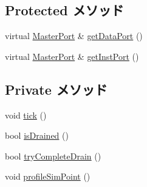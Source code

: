 \subsection*{Protected メソッド}
\begin{DoxyCompactItemize}
\item 
virtual \hyperlink{classMasterPort}{MasterPort} \& \hyperlink{classAtomicSimpleCPU_aeea6b55ae1c4be53c21dbee434b221d4}{getDataPort} ()
\item 
virtual \hyperlink{classMasterPort}{MasterPort} \& \hyperlink{classAtomicSimpleCPU_a40da530cb5dd380fd7fc0d786e94d5eb}{getInstPort} ()
\end{DoxyCompactItemize}
\subsection*{Private メソッド}
\begin{DoxyCompactItemize}
\item 
void \hyperlink{classAtomicSimpleCPU_a873dd91783f9efb4a590aded1f70d6b0}{tick} ()
\item 
bool \hyperlink{classAtomicSimpleCPU_ac166e5bc3ddf730beb1282cf821096ae}{isDrained} ()
\item 
bool \hyperlink{classAtomicSimpleCPU_abfea8f75a7a7480716801affeebbe87b}{tryCompleteDrain} ()
\item 
void \hyperlink{classAtomicSimpleCPU_aa51e4d7f169cd8e8b2e144fdcfd36f33}{profileSimPoint} ()
\end{DoxyCompactItemize}
